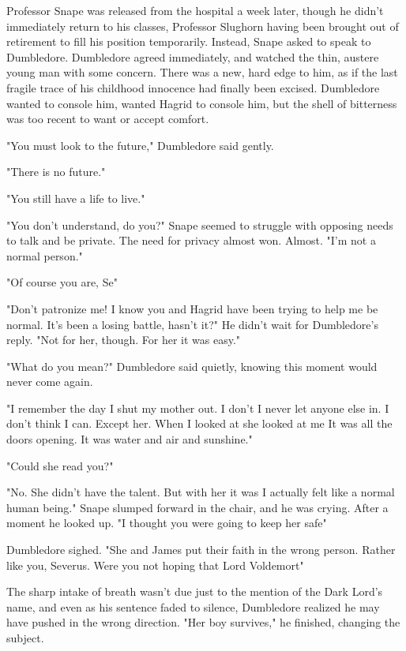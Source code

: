 Professor Snape was released from the hospital a week later, though he didn't immediately return to his classes, Professor Slughorn having been brought out of retirement to fill his position temporarily. Instead, Snape asked to speak to Dumbledore. Dumbledore agreed immediately, and watched the thin, austere young man with some concern. There was a new, hard edge to him, as if the last fragile trace of his childhood innocence had finally been excised. Dumbledore wanted to console him, wanted Hagrid to console him, but the shell of bitterness was too recent to want or accept comfort.

"You must look to the future," Dumbledore said gently.

"There is no future."

"You still have a life to live."

"You don't understand, do you?" Snape seemed to struggle with opposing needs to talk and be private. The need for privacy almost won. Almost. "I'm not a normal person."

"Of course you are, Se{\el}"

"Don't patronize me! I know you and Hagrid have been trying to help me be normal. It's been a losing battle, hasn't it?" He didn't wait for Dumbledore's reply. "Not for her, though. For her it was easy."

"What do you mean?" Dumbledore said quietly, knowing this moment would never come again.

"I remember the day I shut my mother out. I don't{\el} I never let anyone else in. I don't{\el} think I can. Except{\el} her. When I looked at{\el} she looked at me{\el} It was{\el} all the doors{\el} opening. It{\el} was water{\el} and air{\el} and sunshine."

"Could she read you?"

"No. She didn't have the talent. But with her it was{\el} I actually felt{\el} like a normal{\el} human being." Snape slumped forward in the chair, and he was crying. After a moment he looked up. "I thought{\el} you were going{\el} to keep her{\el} safe{\el}"

Dumbledore sighed. "She and James put their faith in the wrong person. Rather like you, Severus. Were you not hoping that Lord Voldemort{\el}"

The sharp intake of breath wasn't due just to the mention of the Dark Lord's name, and even as his sentence faded to silence, Dumbledore realized he may have pushed in the wrong direction. "Her boy survives," he finished, changing the subject.


